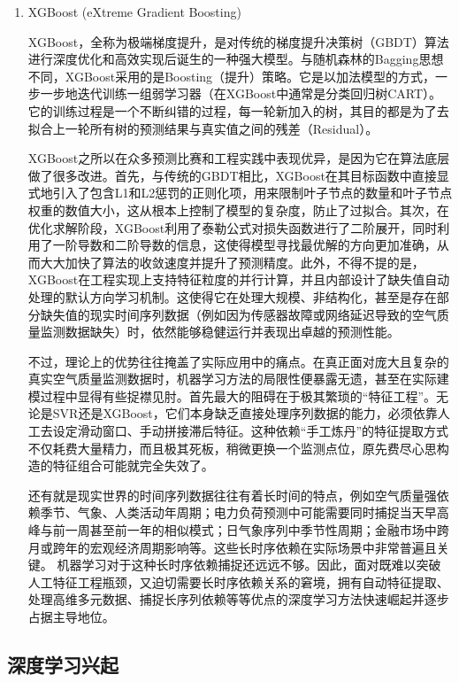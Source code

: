 \begin{enumerate}[label=（\arabic*）, leftmargin=0pt, itemindent=4.5em, labelsep=0.5em, listparindent=2em, parsep=0pt]
    \item XGBoost (eXtreme Gradient Boosting)
    
    XGBoost，全称为极端梯度提升，是对传统的梯度提升决策树（GBDT）算法进行深度优化和高效实现后诞生的一种强大模型。与随机森林的Bagging思想不同，XGBoost采用的是Boosting（提升）策略。它是以加法模型的方式，一步一步地迭代训练一组弱学习器（在XGBoost中通常是分类回归树CART）。它的训练过程是一个不断纠错的过程，每一轮新加入的树，其目的都是为了去拟合上一轮所有树的预测结果与真实值之间的残差（Residual）。

    XGBoost之所以在众多预测比赛和工程实践中表现优异，是因为它在算法底层做了很多改进。首先，与传统的GBDT相比，XGBoost在其目标函数中直接显式地引入了包含L1和L2惩罚的正则化项，用来限制叶子节点的数量和叶子节点权重的数值大小，这从根本上控制了模型的复杂度，防止了过拟合。其次，在优化求解阶段，XGBoost利用了泰勒公式对损失函数进行了二阶展开，同时利用了一阶导数和二阶导数的信息，这使得模型寻找最优解的方向更加准确，从而大大加快了算法的收敛速度并提升了预测精度。此外，不得不提的是，XGBoost在工程实现上支持特征粒度的并行计算，并且内部设计了缺失值自动处理的默认方向学习机制。这使得它在处理大规模、非结构化，甚至是存在部分缺失值的现实时间序列数据（例如因为传感器故障或网络延迟导致的空气质量监测数据缺失）时，依然能够稳健运行并表现出卓越的预测性能。

    不过，理论上的优势往往掩盖了实际应用中的痛点。在真正面对庞大且复杂的真实空气质量监测数据时，机器学习方法的局限性便暴露无遗，甚至在实际建模过程中显得有些捉襟见肘。首先最大的阻碍在于极其繁琐的“特征工程”。无论是SVR还是XGBoost，它们本身缺乏直接处理序列数据的能力，必须依靠人工去设定滑动窗口、手动拼接滞后特征。这种依赖“手工炼丹”的特征提取方式不仅耗费大量精力，而且极其死板，稍微更换一个监测点位，原先费尽心思构造的特征组合可能就完全失效了。

    还有就是现实世界的时间序列数据往往有着长时间的特点，例如空气质量强依赖季节、气象、人类活动年周期；电力负荷预测中可能需要同时捕捉当天早高峰与前一周甚至前一年的相似模式；日气象序列中季节性周期；金融市场中跨月或跨年的宏观经济周期影响等。这些长时序依赖在实际场景中非常普遍且关键。
    机器学习对于这种长时序依赖捕捉还远远不够。因此，面对既难以突破人工特征工程瓶颈，又迫切需要长时序依赖关系的窘境，拥有自动特征提取、处理高维多元数据、捕捉长序列依赖等等优点的深度学习方法快速崛起并逐步占据主导地位。

\end{enumerate}

\subsection{深度学习兴起}

